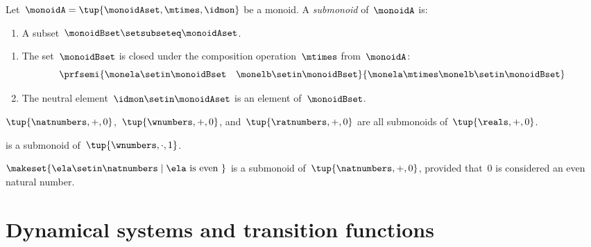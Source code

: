 \begin{definition}[Submonoids]\label{def:submonoids}
    Let~$\monoidA = \tup{\monoidAset, \mtimes, \idmon}$ be a monoid.
    A \emph{submonoid} of~$\monoidA$ is:

    \constit

    \begin{enumerate}
        \item A subset~$\monoidBset \setsubseteq \monoidAset$.
    \end{enumerate}

    \condit

    \begin{enumerate}
        \item The set~$\monoidBset$ is closed under the composition operation~$\mtimes$ from~$\monoidA$:
              \begin{equation}
                  \prfsemi{\monela \setin \monoidBset \quad \monelb \setin \monoidBset}{\monela \mtimes \monelb \setin \monoidBset}
              \end{equation}

        \item The neutral element~$\idmon \setin \monoidAset$ is an element of~$\monoidBset$.
    \end{enumerate}
\end{definition}

\begin{example}
    $\tup{\natnumbers, +,0}$,~$\tup{\wnumbers, +,0}$, and~$\tup{\ratnumbers, +,0}$ are all submonoids of~$\tup{\reals, +,0}$.
\end{example}

\begin{example}
    \natnumbers  is a submonoid of~$\tup{\wnumbers, \cdot, 1}$.
\end{example}

\begin{example}
    $\makeset{ \ela \setin \natnumbers \mid \ela \text{ is even } }$ is a submonoid of~$\tup{\natnumbers, +,0}$, provided that~$0$ is considered an even natural number.
\end{example}

\section[Dynamical systems]{Dynamical systems and transition functions}


